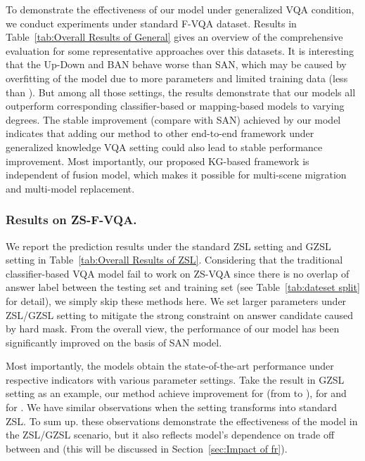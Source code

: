 \documentclass[runningheads]{llncs}
\newcommand{\cjy}[1]{{\color{black}#1}}
\begin{document}
To demonstrate the effectiveness of our model under generalized VQA condition, we conduct experiments under standard F-VQA dataset.
Results in Table~\ref{tab:Overall Results of General} gives an overview of the comprehensive evaluation for some representative approaches over this datasets. 
\cjy{It is} interesting that the Up-Down and BAN behave worse than SAN, which may be caused by overfitting of the model due to more parameters and limited training data (less than ). 
But among all those settings, the results demonstrate that our models all outperform corresponding classifier-based or mapping-based models to varying degrees.
The stable improvement (compare with SAN) achieved by our model indicates that adding our method to other end-to-end framework under generalized knowledge VQA  setting could also lead to stable performance improvement. Most importantly, our proposed KG-based framework is independent of fusion model, which makes it possible for multi-scene migration and multi-model replacement.
\subsubsection{Results on ZS-F-VQA.}
We report the prediction results under the standard ZSL setting and GZSL setting in Table~\ref{tab:Overall Results of ZSL}. 
Considering that the traditional classifier-based VQA model fail to work on ZS-VQA since there is no overlap of answer label between the testing set and training set (see Table~\ref{tab:dateset split} for detail), we simply skip these methods here.
We set larger parameters  under ZSL/GZSL setting to mitigate the strong constraint on answer candidate caused by hard mask.
From the overall view, the performance of our model has been significantly improved on the basis of SAN model. 

Most importantly, the models obtain the state-of-the-art performance under respective indicators with various parameter settings. Take the result in GZSL setting as an example, our method achieve  improvement  for  (from  to ),  for  and  for .
We have similar observations when the setting transforms into standard ZSL.
To sum up. these observations demonstrate the effectiveness of the model in the ZSL/GZSL scenario, but it also reflects model's dependence on trade off between  and  (this will be discussed in Section~\ref{sec:Impact of fr}).
\end{document}

